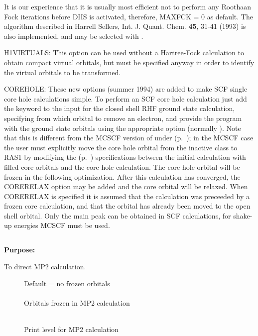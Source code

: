 It is our experience that
it is usually most efficient not to perform any Roothaan Fock iterations
before DIIS is activated, therefore, MAXFCK = 0 as default.
The algorithm described in
Harrell Sellers, Int. J. Quant. Chem. {\bf 45}, 31-41 (1993) is
also implemented, and may be selected with .

 
H1VIRTUALS: This option can be used without a Hartree-Fock calculation
to obtain compact virtual orbitals, but  must be
specified anyway in order to identify the virtual orbitals to be transformed.
 
COREHOLE: These new options (summer 1994) are added to make SCF single
core hole
calculations simple. To perform an SCF core hole calculation just add the
 keyword to the input for the closed shell RHF
ground state calculation, 
specifying from which orbital to remove an electron, and
provide the program with the ground state orbitals using the appropriate
 option (normally ).
Note that this is different from the MCSCF version
of  under 
(p.~\pageref{ref-optinp}); in the MCSCF case
the user must explicitly 
move the core hole orbital from the inactive class to RAS1
by modifying the 
(p.~\pageref{ref-wavinp}) specifications
between the initial calculation with filled core orbitals and the core hole calculation.
The core hole orbital will be frozen in the following optimization. 
After this calculation has converged, the CORERELAX option may be added
and the core orbital will be relaxed.  When
CORERELAX is specified it is 
assumed that the calculation was preceeded by a frozen core calculation,
and that the orbital has already been moved to the open shell orbital.
Only the main peak can be obtained in SCF calculations, for shake-up energies 
MCSCF must be used.
 
\pagebreak[3]
\subsection{\label{ref-mp2inp}}
 
{\bf Purpose:}
 
To direct MP2 calculation.
 
\begin{description}
\item[]
  Default = no frozen orbitals\\
   \\
  Orbitals frozen in MP2 calculation
 
\item[]
   \\
  Print level for MP2 calculation
\end{description}
 
